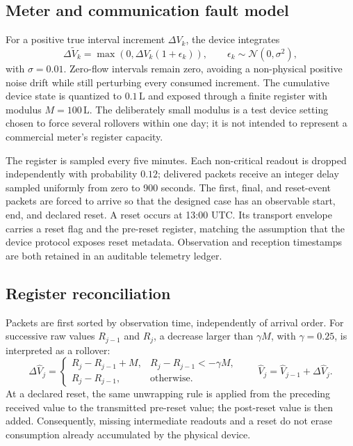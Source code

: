 \documentclass[11pt,a4paper]{article}
\begin{document}
\subsection{Meter and communication fault model}
For a positive true interval increment $\Delta V_k$, the device integrates
\begin{equation}
  \Delta \widetilde V_k =
  \max\left(0,\Delta V_k(1+\epsilon_k)\right),\qquad
  \epsilon_k\sim\mathcal{N}(0,\sigma^2),
\end{equation}
with $\sigma=0.01$. Zero-flow intervals remain zero, avoiding a non-physical
positive noise drift while still perturbing every consumed increment. The
cumulative device state is quantized to $0.1\,\mathrm{L}$ and exposed through a
finite register with modulus $M=100\,\mathrm{L}$. The deliberately small
modulus is a test device setting chosen to force several rollovers within one
day; it is not intended to represent a commercial meter's register capacity.

The register is sampled every five minutes. Each non-critical readout is
dropped independently with probability $0.12$; delivered packets receive an
integer delay sampled uniformly from zero to 900 seconds. The first, final, and
reset-event packets are forced to arrive so that the designed case has an
observable start, end, and declared reset. A reset occurs at 13:00 UTC. Its
transport envelope carries a reset flag and the pre-reset register, matching the
assumption that the device protocol exposes reset metadata. Observation and
reception timestamps are both retained in an auditable telemetry ledger.

\subsection{Register reconciliation}
Packets are first sorted by observation time, independently of arrival order.
For successive raw values $R_{j-1}$ and $R_j$, a decrease larger than
$\gamma M$, with $\gamma=0.25$, is interpreted as a rollover:
\begin{equation}
  \Delta \widehat V_j =
  \begin{cases}
    R_j-R_{j-1}+M, & R_j-R_{j-1}< -\gamma M,\\
    R_j-R_{j-1}, & \text{otherwise}.
  \end{cases}
  \qquad
  \widehat V_j=\widehat V_{j-1}+\Delta\widehat V_j.
\end{equation}
At a declared reset, the same unwrapping rule is applied from the preceding
received value to the transmitted pre-reset value; the post-reset value is then
added. Consequently, missing intermediate readouts and a reset do not erase
consumption already accumulated by the physical device.
\end{document}
